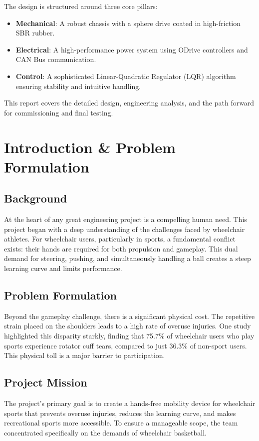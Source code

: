 \documentclass[12pt]{article}
\begin{document}
The design is structured around three core pillars:
\begin{itemize}
    \item \textbf{Mechanical}: A robust chassis with a sphere drive coated in high-friction SBR rubber.
    \item \textbf{Electrical}: A high-performance power system using ODrive controllers and CAN Bus communication.
    \item \textbf{Control}: A sophisticated Linear-Quadratic Regulator (LQR) algorithm ensuring stability and intuitive handling.
\end{itemize}

This report covers the detailed design, engineering analysis, and the path forward for commissioning and final testing.

\newpage
\tableofcontents
\newpage

\section{Introduction \& Problem Formulation}

\subsection{Background}
At the heart of any great engineering project is a compelling human need. This project began with a deep understanding of the challenges faced by wheelchair athletes. For wheelchair users, particularly in sports, a fundamental conflict exists: their hands are required for both propulsion and gameplay. This dual demand for steering, pushing, and simultaneously handling a ball creates a steep learning curve and limits performance.

\subsection{Problem Formulation}
Beyond the gameplay challenge, there is a significant physical cost. The repetitive strain placed on the shoulders leads to a high rate of overuse injuries. One study highlighted this disparity starkly, finding that 75.7\% of wheelchair users who play sports experience rotator cuff tears, compared to just 36.3\% of non-sport users. This physical toll is a major barrier to participation.

\subsection{Project Mission}
The project's primary goal is to create a hands-free mobility device for wheelchair sports that prevents overuse injuries, reduces the learning curve, and makes recreational sports more accessible. To ensure a manageable scope, the team concentrated specifically on the demands of wheelchair basketball.
\end{document}

